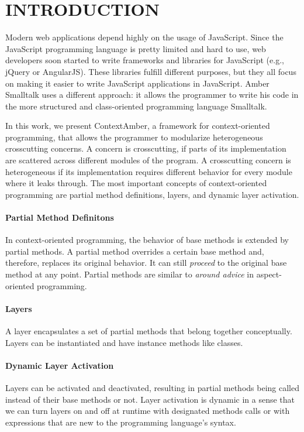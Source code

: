 \documentclass[english,paper=a4,twocolumn=true,DIV=calc,fontsize=9pt]{scrartcl}
\begin{document}


\section{INTRODUCTION}
Modern web applications depend highly on the usage of JavaScript. Since the JavaScript programming language is pretty limited and hard to use, web developers soon started to write frameworks and libraries for JavaScript (e.g., jQuery or AngularJS). These libraries fulfill different purposes, but they all focus on making it easier to write JavaScript applications in JavaScript. Amber Smalltalk uses a different approach: it allows the programmer to write his code in the more structured and class-oriented programming language Smalltalk.

In this work, we present ContextAmber, a framework for context-oriented programming, that allows the programmer to modularize heterogeneous crosscutting concerns. A concern is crosscutting, if parts of its implementation are scattered across different modules of the program. A crosscutting concern is heterogeneous if its implementation requires different behavior for every module where it leaks through. The most important concepts of context-oriented programming are partial method definitions, layers, and dynamic layer activation.

\paragraph{Partial Method Definitons}
In context-oriented programming, the behavior of base methods is extended by partial methods. A partial method overrides a certain base method and, therefore, replaces its original behavior. It can still \emph{proceed} to the original base method at any point. Partial methods are similar to \emph{around advice} in aspect-oriented programming.

\paragraph{Layers}
A layer encapsulates a set of partial methods that belong together conceptually. Layers can be instantiated and have instance methods like classes.

\paragraph{Dynamic Layer Activation}
Layers can be activated and deactivated, resulting in partial methods being called instead of their base methods or not. Layer activation is dynamic in a sense that we can turn layers on and off at runtime with designated methods calls or with expressions that are new to the programming language's syntax.
\end{document}
